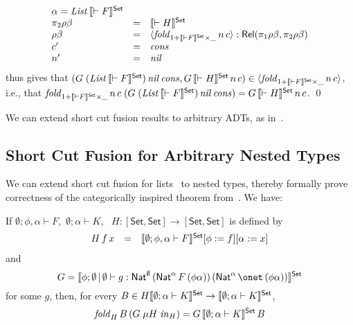 \documentclass{lmcs}
\theoremstyle{plain}\newtheorem{satz}[thm]{Satz}
\newcommand{\set}{\mathsf{Set}}
\begin{document}
{\[\begin{array}{lll}
{  \alpha}=\mathit{List}\,\setsem{\vdash F}\\
\pi_2 \rho \beta & = & \setsem{\vdash H}\\
\rho \beta & = & \graph{\mathit{fold}_{1 + \setsem{\vdash F} \times \_}\, n\, c} :
\rel(\pi_1 \rho \beta, \pi_2 \rho \beta)\\
c' & = & \mathit{cons}\\
n' & = & \mathit{nil}
\end{array}\]
thus gives that $(G \;(\mathit{List}\,\setsem{\vdash
  F})\,\mathit{nil} \,\mathit{cons}, G \,\setsem{\vdash H} \,
n\, c) \in \graph{\mathit{fold}_{1 + \setsem{\vdash F} \times \_}\, n\, c}$, i.e.,
that $\mathit{fold}_{1 + \setsem{\vdash F} \times \_}\, n\, c\; (G\;
(\mathit{List}\,\setsem{\vdash F})\, \mathit{nil}\, \mathit{cons})
= G \,\setsem{\vdash H}\, n\, c$.
\qed

We can extend short cut fusion results to arbitrary ADTs, as
in~\cite{joh02,pit98}.

\subsection{Short Cut Fusion for Arbitrary Nested
  Types}\label{sec:short-cut-nested} 

We can extend short cut fusion for lists~\cite{glp93} to nested types,
thereby formally prove correctness of the categorically inspired
theorem from~\cite{jg10}.  We have:
\begin{thm}\label{thm:short-cut-nested}
If $\emptyset;\phi,\alpha \vdash F$, \,$\emptyset; \alpha
\vdash K$, \,
$H : [\set,\set] \to [\set,\set]$ is defined by
\[\begin{array}{lll}
H\,f\,x & = & \setsem{\emptyset; \phi, \alpha \vdash F}[\phi :=
  f][\alpha := x]\\
\end{array}\]
and 
\[G = \setsem{\phi;\emptyset\,|\,\emptyset \vdash g :
\Nat^\emptyset\,(\Nat^\alpha\,F\,(\phi\alpha))\,(\Nat^\alpha\,\onet \,
(\phi\alpha))}\] for some $g$, then, for every $B \in H
\setsem{\emptyset;\alpha \vdash K} \rightarrow \setsem{\emptyset;
  \alpha \vdash K}$,
$$\mathit{fold}_{H}\, B \, (G\; \mu H \; \mathit{in}_{H}) = G
\,\setsem{\emptyset;\alpha \vdash K}\, B$$
\end{thm}

}
\end{document}
